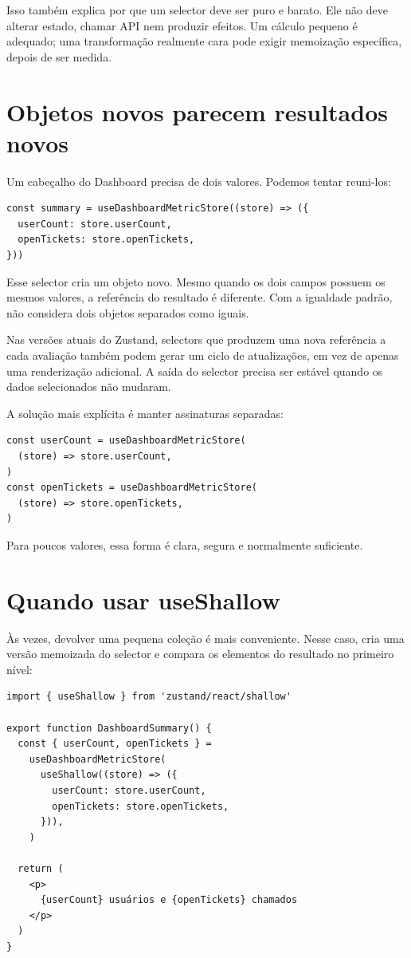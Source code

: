 Isso também explica por que um selector deve ser puro e barato. Ele não deve
alterar estado, chamar API nem produzir efeitos. Um cálculo pequeno é adequado;
uma transformação realmente cara pode exigir memoização específica, depois de
ser medida.

\section{Objetos novos parecem resultados novos}

Um cabeçalho do Dashboard precisa de dois valores. Podemos tentar reuni-los:

\begin{lstlisting}[caption={Um novo objeto é criado a cada avaliação.}]
const summary = useDashboardMetricStore((store) => ({
  userCount: store.userCount,
  openTickets: store.openTickets,
}))
\end{lstlisting}

Esse selector cria um objeto novo. Mesmo quando os dois campos possuem os mesmos
valores, a referência do resultado é diferente. Com a igualdade padrão,
 não considera dois objetos separados como iguais.

Nas versões atuais do Zustand, selectors que produzem uma nova referência a
cada avaliação também podem gerar um ciclo de atualizações, em vez de apenas uma
renderização adicional. A saída do selector precisa ser estável quando os dados
selecionados não mudaram.

A solução mais explícita é manter assinaturas separadas:

\begin{lstlisting}
const userCount = useDashboardMetricStore(
  (store) => store.userCount,
)
const openTickets = useDashboardMetricStore(
  (store) => store.openTickets,
)
\end{lstlisting}

Para poucos valores, essa forma é clara, segura e normalmente suficiente.

\section{Quando usar useShallow}

Às vezes, devolver uma pequena coleção é mais conveniente. Nesse caso,
 cria uma versão memoizada do selector e compara os elementos
do resultado no primeiro nível:

\begin{lstlisting}[caption={Dois valores reunidos com comparação rasa.},label={lst:summary-use-shallow}]
import { useShallow } from 'zustand/react/shallow'

export function DashboardSummary() {
  const { userCount, openTickets } =
    useDashboardMetricStore(
      useShallow((store) => ({
        userCount: store.userCount,
        openTickets: store.openTickets,
      })),
    )

  return (
    <p>
      {userCount} usuários e {openTickets} chamados
    </p>
  )
}
\end{lstlisting}

